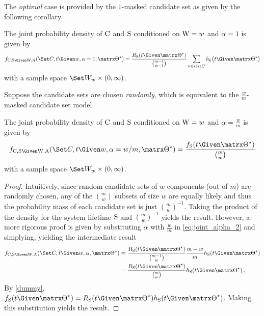 \documentclass[../main.tex]{subfiles}
\begin{document}
The \emph{optimal} case is provided by the $1$-masked candidate set as given by the following corollary.
\begin{corollary}
	\label{thm:general_joint_likelihood_cand}
	The joint probability density of $\mathrm{C}$ and $\mathrm{S}$ conditioned on $\mathrm{W} = w$ and $\alpha=1$ is given by
	\begin{equation}
	\label{eq:general_joint_likelihood_cand}
	\pdf_{\rvcand, \sv \Given \RV{W}, \RV{A}}(\cand, t \Given w, \alpha=1,\tparam\sysparam) = \frac{\srv_{\sv}(t \Given \tparam\sysparam)}{\binom{m-1}{w-1}}	
	\sum_{k \in \cand} \haz_k\!\left(t \Given \tparam\sysparam\right)
	\end{equation}
	with a sample space $\candsw{w} \times (0,\infty)$.
\end{corollary}

Suppose the candidate sets are chosen \emph{randomly}, which is equivalent to the $\frac{w}{m}$-masked candidate set model.
\begin{corollary}
The joint probability density of $\mathrm{C}$ and $\mathrm{S}$ conditioned on $\mathrm{W} = w$ and $\alpha=\frac{w}{m}$ is given by
\begin{equation}
	\pdf_{\rvcand, \sv \Given \RV{W}, \RV{A}}(\cand, t \Given w, \alpha=w/m,\tparam\sysparam) = \frac{\spdf(t \Given \tparam\sysparam)}{\binom{m}{w}}	
\end{equation}
with a sample space $\candsw{w} \times (0,\infty)$.
\end{corollary}
\begin{proof}
Intuitively, since random candidate sets of $w$ components (out of $m$) are randomly chosen, any of the $\binom{m}{w}$ subsets of size $w$ are equally likely and thus the probability mass of each candidate set is just $\binom{m}{w}^{-1}$.
Taking the product of the density for the system lifetime $\mathrm{S}$ and $\binom{m}{w}^{-1}$ yields the result.
However, a more rigorous proof is given by substituting $\alpha$ with $\frac{w}{m}$ in \cref{eq:joint_alpha_2} and simplying, yielding the intermediate result
\begin{align}
\pdf_{\rvcand,\sv \Given \RV{W}, \RV{A}}(\cand,t \Given w, \alpha, \tparam\sysparam)
	&= \frac{\srv_{\sv}(t \Given \tparam\sysparam)}{\binom{m-1}{w}}
		\frac{m-w}{m} \haz_{\sv}(t \Given \tparam\sysparam)\\
	&= \frac{\srv_{\sv}(t \Given \tparam\sysparam)}{\binom{m}{w}}
	\haz_{\sv}(t \Given \tparam\sysparam)\,.
\end{align}
By \cref{dummy}, $\spdf(t \Given \tparam\sysparam) = \srv_{\sv}(t \Given \tparam\sysparam) \haz_{\sv}(t \Given \tparam\sysparam)$.
Making this substitution yields the result.
\end{proof}
\end{document}
